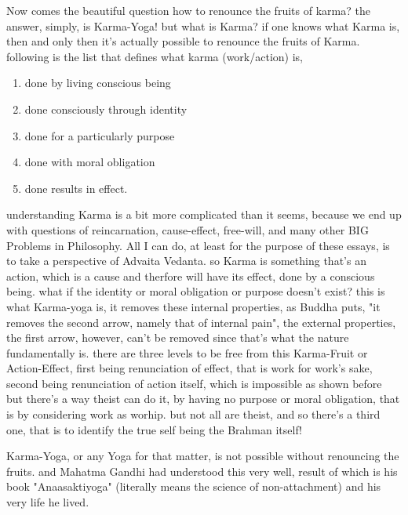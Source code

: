 \documentclass[a4paper]{article}
\begin{document}
Now comes the beautiful question how to renounce the fruits of karma? the answer, simply, 
is Karma-Yoga! but what is Karma? if one knows what Karma is, then and only then it's actually possible 
to renounce the fruits of Karma. following is the list that defines what karma (work/action) is,
\begin{enumerate}
    \item done by living conscious being
    \item done consciously through identity
    \item done for a particularly purpose
    \item done with moral obligation
    \item done results in effect.
\end{enumerate}
understanding Karma is a bit more complicated than it seems, because we end up with questions of reincarnation,
cause-effect, free-will, and many other BIG Problems in Philosophy. All I can do, at least for the purpose
of these essays, is to take a perspective of Advaita Vedanta. so Karma is something that's an action,
which is a cause and therfore will have its effect, done by a conscious being. what if the 
identity or moral obligation or purpose doesn't exist? this is what Karma-yoga is, it removes these 
internal properties, as Buddha puts, "it removes the second arrow, namely that of internal pain", 
the external properties, the first arrow, however, can't be removed since that's what the nature fundamentally is. 
there are three levels to be free from this Karma-Fruit or Action-Effect, first being renunciation 
of effect, that is work for work's sake, second being renunciation of action itself, which is impossible
as shown before but there's a way theist can do it, by having no purpose or moral obligation,
that is by considering work as worhip. but not all are theist, and so there's a third one, that is to
identify the true self being the Brahman itself!

Karma-Yoga, or any Yoga for that matter, is not possible without renouncing the fruits. and Mahatma 
Gandhi had understood this very well, result of which is his book "Anaasaktiyoga" (literally means 
the science of non-attachment) and his very life he lived.
\end{document}
